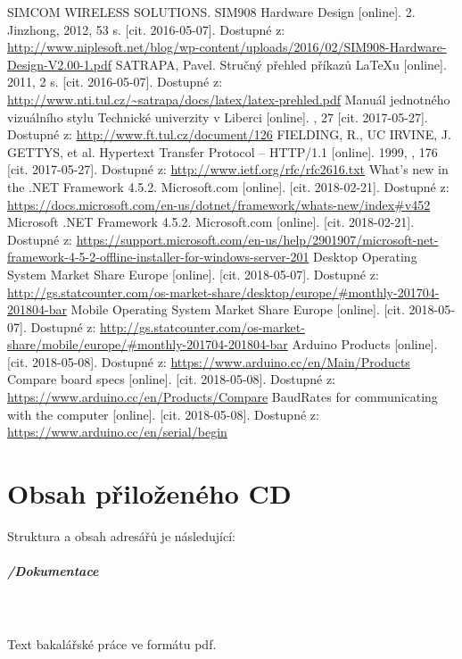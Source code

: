 \documentclass[FM,DP]{tulthesis}  %
\begin{document}
\begin{thebibliography}{10}
SIMCOM WIRELESS SOLUTIONS. SIM908 Hardware Design [online]. 2. Jinzhong, 2012, 53 s. [cit. 2016-05-07]. Dostupné z: \url{http://www.niplesoft.net/blog/wp-content/uploads/2016/02/SIM908-Hardware-Design-V2.00-1.pdf}
SATRAPA, Pavel. Stručný přehled příkazů LaTeXu [online]. 2011, 2 s. [cit. 2016-05-07]. Dostupné z: \url{http://www.nti.tul.cz/~satrapa/docs/latex/latex-prehled.pdf}
Manuál jednotného vizuálního stylu Technické univerzity v Liberci [online]. , 27 [cit. 2017-05-27]. Dostupné z: \url{http://www.ft.tul.cz/document/126}
FIELDING, R., UC IRVINE, J. GETTYS, et al. Hypertext Transfer Protocol -- HTTP/1.1 [online]. 1999, , 176 [cit. 2017-05-27]. Dostupné z: \url{http://www.ietf.org/rfc/rfc2616.txt}
What's new in the .NET Framework 4.5.2. Microsoft.com [online]. [cit. 2018-02-21]. Dostupné z: \url{https://docs.microsoft.com/en-us/dotnet/framework/whats-new/index#v452}
Microsoft .NET Framework 4.5.2. Microsoft.com [online]. [cit. 2018-02-21]. Dostupné z: \url{https://support.microsoft.com/en-us/help/2901907/microsoft-net-framework-4-5-2-offline-installer-for-windows-server-201}
Desktop Operating System Market Share Europe [online]. [cit. 2018-05-07]. Dostupné z: \url{http://gs.statcounter.com/os-market-share/desktop/europe/#monthly-201704-201804-bar}
Mobile Operating System Market Share Europe [online]. [cit. 2018-05-07]. Dostupné z: \url{http://gs.statcounter.com/os-market-share/mobile/europe/#monthly-201704-201804-bar}
Arduino Products [online]. [cit. 2018-05-08]. Dostupné z: \url{https://www.arduino.cc/en/Main/Products}
Compare board specs [online]. [cit. 2018-05-08]. Dostupné z: \url{https://www.arduino.cc/en/Products/Compare}
BaudRates for communicating with the computer [online]. [cit. 2018-05-08]. Dostupné z: \url{https://www.arduino.cc/en/serial/begin}
\end{thebibliography}


\appendix

\chapter{Obsah přiloženého CD}
Struktura a obsah adresářů je následující:

\paragraph{/Dokumentace}\mbox{}\\\mbox{}\\
Text bakalářské práce ve formátu pdf.
\end{document}

